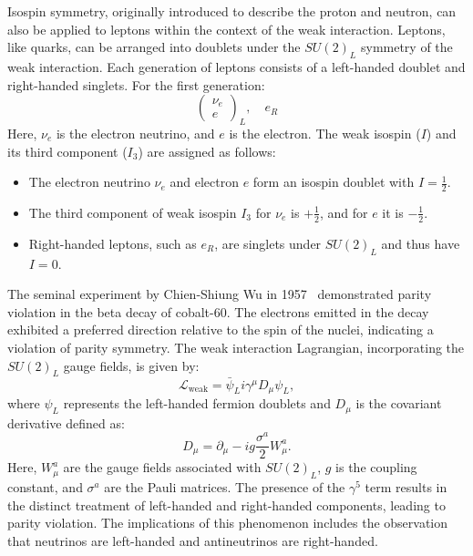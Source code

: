         Isospin symmetry, originally introduced to describe the proton and neutron, can also be applied 
        to leptons within the context of the weak interaction.
        Leptons, like quarks, can be arranged into doublets under the $SU(2)_L$ symmetry of the weak interaction. 
        Each generation of leptons consists of a left-handed doublet and right-handed singlets. For the first generation:
        \begin{equation}
            \begin{pmatrix}
            \nu_e \\
            e
            \end{pmatrix}_L, \quad e_R
        \end{equation}
        Here, $\nu_e$ is the electron neutrino, and $e$ is the electron.
        The weak isospin ($I$) and its third component ($I_3$) are assigned as follows:
        \begin{itemize}
            \item The electron neutrino $\nu_e$ and electron $e$ form an isospin doublet with $I = \frac{1}{2}$.
            \item The third component of weak isospin $I_3$ for $\nu_e$ is $+\frac{1}{2}$, and for $e$ it is $-\frac{1}{2}$.
            \item Right-handed leptons, such as $e_R$, are singlets under $SU(2)_L$ and thus have $I = 0$.
        \end{itemize}

        The seminal experiment by Chien-Shiung Wu in 1957~\cite{PhysRev.105.1413} demonstrated parity violation in 
        the beta decay of cobalt-60. The electrons emitted in the decay exhibited a preferred 
        direction relative to the spin of the nuclei, indicating a violation of parity symmetry.
        The weak interaction Lagrangian, incorporating the \(SU(2)_L\) gauge fields, is given by:
        \begin{equation}
            \mathcal{L}_{\text{weak}} = \bar{\psi}_L i \gamma^\mu D_\mu \psi_L,
        \end{equation}
        where \(\psi_L\) represents the left-handed fermion doublets and \(D_\mu\) is the covariant derivative defined as:
        \begin{equation}
            D_\mu = \partial_\mu - i g \frac{\sigma^a}{2} W_\mu^a.
        \end{equation}
        Here, \(W_\mu^a\) are the gauge fields associated with \(SU(2)_L\), \(g\) is the coupling constant, and \(\sigma^a\) are the Pauli matrices.
        The presence of the $\gamma^5$ term results in the distinct treatment of left-handed and right-handed components, 
        leading to parity violation. The implications of this phenomenon includes 
        the observation that neutrinos are left-handed and antineutrinos are right-handed.

